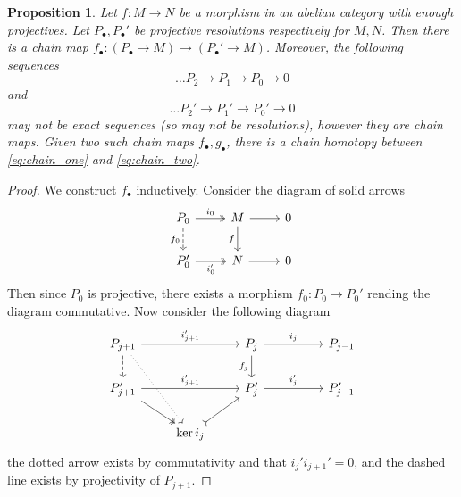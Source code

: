 \documentclass[12pt]{article}
\theoremstyle{plain}
\newtheorem{proposition}[thm]{Proposition}
\theoremstyle{definition}
\newcommand{\lto}{\longrightarrow}
\begin{document}
\begin{proposition}\label{prop:induced_chain_map}
Let $f: M \lto N$ be a morphism in an abelian category with enough projectives. Let $P_\bullet, P_\bullet'$ be projective resolutions respectively for $M,N$. Then there is a chain map $f_\bullet: (P_\bullet \lto M) \lto (P_\bullet' \lto M)$. Moreover, the following sequences
\begin{equation}\label{eq:chain_one}
\hdots P_{2} \lto P_1 \lto P_0 \lto 0
\end{equation}
and
\begin{equation}\label{eq:chain_two}
\hdots P_2' \lto P_1' \lto P_0' \lto 0
\end{equation}
may not be exact sequences (so may not be resolutions), however they are chain maps. Given two such chain maps $f_\bullet,g_\bullet$, there is a chain homotopy between \eqref{eq:chain_one} and \eqref{eq:chain_two}.
\end{proposition}
\begin{proof}
We construct $f_\bullet$ inductively. Consider the diagram of solid arrows
\begin{equation}
\begin{tikzcd}
P_0\arrow[r,twoheadrightarrow,"{i_0}"]\arrow[d,dashed,swap,"{f_0}"] & M\arrow[d,swap,"f"]\arrow[r] & 0\\
P_0'\arrow[r,swap,twoheadrightarrow,"{i_0'}"] & N\arrow[r] & 0
\end{tikzcd}
\end{equation}
Then since $P_0$ is projective, there exists a morphism $f_0: P_0 \lto P_0'$ rending the diagram commutative. Now consider the following diagram
\begin{equation}
\begin{tikzcd}
P_{j+1}\arrow[rr,"{i_{j+1}'}"]\arrow[ddr,dotted]\arrow[d,dashed] & & P_j\arrow[rr,"{i_j}"]\arrow[d,swap,"{f_j}"] & & P_{j-1}\\
P_{j+1}'\arrow[dr,twoheadrightarrow]\arrow[rr,"{i_{j+1}'}"] & & P_j'\arrow[rr,"{i_j'}"] & & P_{j-1}'\\
 & \operatorname{ker}i_{j}\arrow[ur,rightarrowtail]
\end{tikzcd}
\end{equation}
the dotted arrow exists by commutativity and that $i_j' i_{j+1}' = 0$, and the dashed line exists by projectivity of $P_{j+1}$.
\end{proof}
\end{document}
